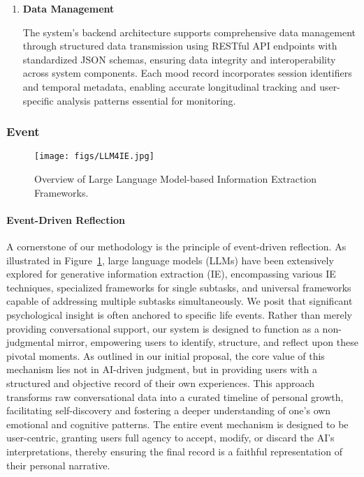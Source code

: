 \begin{enumerate}
\item \textbf{Data Management}

The system's backend architecture supports comprehensive data management through structured data transmission using RESTful API endpoints with standardized JSON schemas, ensuring data integrity and interoperability across system components. Each mood record incorporates session identifiers and temporal metadata, enabling accurate longitudinal tracking and user-specific analysis patterns essential for monitoring.

\end{enumerate}


\subsubsection{Event}

\begin{figure}[h]
    \centering
    \texttt{[image: figs/LLM4IE.jpg]}
    \caption{Overview of Large Language Model-based Information Extraction Frameworks.}
    \label{fig:LLM4IE}
\end{figure}

\paragraph{Event-Driven Reflection}
A cornerstone of our methodology is the principle of event-driven reflection. As illustrated in Figure~\ref{fig:LLM4IE}, large language models (LLMs) have been extensively explored for generative information extraction (IE), encompassing various IE techniques, specialized frameworks for single subtasks, and universal frameworks capable of addressing multiple subtasks simultaneously. We posit that significant psychological insight is often anchored to specific life events. Rather than merely providing conversational support, our system is designed to function as a non-judgmental mirror, empowering users to identify, structure, and reflect upon these pivotal moments. As outlined in our initial proposal, the core value of this mechanism lies not in AI-driven judgment, but in providing users with a structured and objective record of their own experiences. This approach transforms raw conversational data into a curated timeline of personal growth, facilitating self-discovery and fostering a deeper understanding of one's own emotional and cognitive patterns. The entire event mechanism is designed to be user-centric, granting users full agency to accept, modify, or discard the AI's interpretations, thereby ensuring the final record is a faithful representation of their personal narrative.

